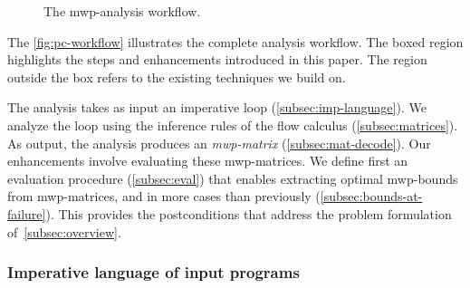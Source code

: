 \begin{figure}[H]
\centering
{}

\caption[The mwp-analysis workflow]{The mwp-analysis workflow.}
\label{fig:pc-workflow}
\end{figure}

The \autoref{fig:pc-workflow} illustrates the complete analysis workflow.
The boxed region highlights the steps and enhancements introduced in this paper.
The region outside the box refers to the existing techniques we build on.

The analysis takes as input an imperative loop (\autoref{subsec:imp-language}).
We analyze the loop using the inference rules of the flow calculus (\autoref{subsec:matrices}).
As output, the analysis produces an \emph{mwp-matrix} (\autoref{subsec:mat-decode}).
Our enhancements involve {evaluating} these mwp-matrices.
We define first an {evaluation procedure} (\autoref{subsec:eval}) that enables extracting optimal mwp-bounds from mwp-matrices,
and in more cases than previously (\autoref{subsec:bounds-at-failure}).
This provides the postconditions that address the problem formulation of~\autoref{subsec:overview}.

\subsubsection{Imperative language of input programs}
\label{subsec:imp-language}

